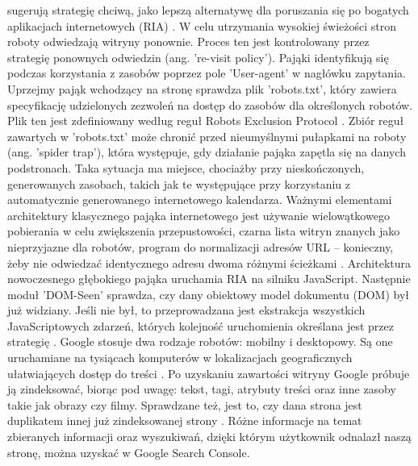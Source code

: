 sugerują strategię chciwą, jako lepszą alternatywę dla poruszania się po bogatych aplikacjach
internetowych (RIA) \autocite{mirtaheri2014brief}. W celu utrzymania wysokiej świeżości stron roboty odwiedzają
witryny ponownie. Proces ten jest kontrolowany przez strategię ponownych odwiedzin (ang. 're-visit
policy').
Pająki identyfikują się podczas korzystania z zasobów poprzez pole 'User-agent' w nagłówku zapytania. Uprzejmy
pająk wchodzący na stronę sprawdza plik 'robots.txt', który zawiera specyfikację udzielonych
zezwoleń na dostęp do zasobów dla określonych robotów. Plik ten jest zdefiniowany według reguł
Robots Exclusion Protocol \autocite{googlerobots}. Zbiór reguł zawartych w 'robots.txt' może chronić przed nieumyślnymi pułapkami
na roboty (ang. 'spider trap'), która występuje, gdy działanie pająka zapętla się na danych podstronach.
Taka sytuacja ma miejsce, chociażby przy nieskończonych, generowanych zasobach, takich jak te występujące przy korzystaniu z
automatycznie generowanego internetowego kalendarza.
Ważnymi elementami architektury klasycznego pająka internetowego jest używanie
wielowątkowego pobierania w celu zwiększenia przepustowości, czarna lista witryn znanych jako
nieprzyjazne dla robotów, program do normalizacji adresów URL – konieczny, żeby nie odwiedzać
identycznego adresu dwoma różnymi ścieżkami \autocite{mirtaheri2014brief}. Architektura nowoczesnego głębokiego pająka
uruchamia RIA na silniku JavaScript. Następnie moduł 'DOM-Seen' sprawdza, czy dany obiektowy
model dokumentu (DOM) był już widziany. Jeśli nie był, to przeprowadzana jest ekstrakcja wszystkich
JavaScriptowych zdarzeń, których kolejność uruchomienia określana jest przez strategię \autocite{mirtaheri2014brief}. Google stosuje dwa rodzaje robotów: mobilny i desktopowy. Są one uruchamiane na tysiącach
komputerów w lokalizacjach geograficznych ułatwiających dostęp do treści \autocite{googlebot}. Po uzyskaniu zawartości
witryny Google próbuje ją zindeksować, biorąc pod uwagę: tekst, tagi, atrybuty treści oraz inne zasoby
takie jak obrazy czy filmy. Sprawdzane też, jest to, czy dana strona jest duplikatem innej już
zindeksowanej strony \autocite{przewodnikgoogle}. Różne informacje na temat zbieranych informacji oraz wyszukiwań, dzięki
którym użytkownik odnalazł naszą stronę, można uzyskać w Google Search Console.\newline

